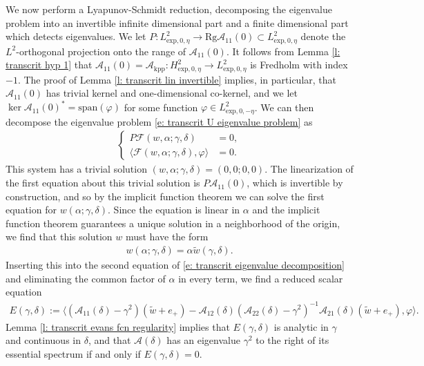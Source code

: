 \documentclass[11pt]{article}
\renewcommand{\phi}{\varphi}
\newcommand{\spn}{\text{\span}}
\newcommand{\Rg}{\mathrm{Rg}}
\numberwithin{equation}{section}
\numberwithin{prop}{section}
\renewcommand{\spn}{\mathrm{span}}
\begin{document}
We now perform a Lyapunov-Schmidt reduction, decomposing the eigenvalue problem into an invertible infinite dimensional part and a finite dimensional part which detects eigenvalues. We let $P: L^2_{\mathrm{exp}, 0, \eta} \to \Rg \mathcal{A}_{11}(0) \subset L^2_{\mathrm{exp}, 0, \eta}$ denote the $L^2$-orthogonal projection onto the range of $\mathcal{A}_{11}(0)$. It follows from Lemma \ref{l: transcrit hyp 1} that $\mathcal{A}_{11}(0) = \mathcal{A}_\mathrm{kpp} : H^2_{\mathrm{exp}, 0, \eta} \to L^2_{\mathrm{exp}, 0, \eta}$ is Fredholm with index $-1$. The proof of Lemma \ref{l: transcrit lin invertible} implies, in particular, that $\mathcal{A}_{11}(0)$ has trivial kernel and one-dimensional co-kernel, and we let $\ker \mathcal{A}_{11}(0)^* = \spn (\phi)$ for some function $\phi \in L^2_{\mathrm{exp}, 0, -\eta}$. We can then decompose the eigenvalue problem \eqref{e: transcrit U eigenvalue problem} as 
\begin{align}
	\begin{cases}
		P \mathcal{F} (w, \alpha; \gamma, \delta) &= 0, \\
		\langle \mathcal{F}(w, \alpha;\gamma, \delta), \phi \rangle &= 0. 
	\end{cases} \label{e: transcrit eigenvalue decomposition}
\end{align}
This system has a trivial solution $(w, \alpha; \gamma, \delta) = (0, 0; 0, 0)$. The linearization of the first equation about this trivial solution is $P \mathcal{A}_{11}(0)$, which is invertible by construction, and so by the implicit function theorem we can solve the first equation for $w(\alpha; \gamma, \delta)$. Since the equation is linear in $\alpha$ and the implicit function theorem guarantees a unique solution in a neighborhood of the origin, we find that this solution $w$ must have the form
\begin{align}
	w (\alpha; \gamma, \delta) = \alpha \tilde{w}(\gamma, \delta). 
\end{align}
Inserting this into the second equation of \eqref{e: transcrit eigenvalue decomposition} and eliminating the common factor of $\alpha$ in every term, we find a reduced scalar equation
\begin{align}
	E(\gamma, \delta) := \langle (\mathcal{A}_{11}(\delta) - \gamma^2) (\tilde{w} + e_+) - \mathcal{A}_{12} (\delta) (\mathcal{A}_{22}(\delta) - \gamma^2)^{-1} \mathcal{A}_{21}(\delta) (\tilde{w} + e_+), \phi \rangle.
\end{align}
Lemma \ref{l: transcrit evans fcn regularity} implies that $E(\gamma, \delta)$ is analytic in $\gamma$ and continuous in $\delta$, and that $\mathcal{A}(\delta)$ has an eigenvalue $\gamma^2$ to the right of its essential spectrum if and only if $E(\gamma, \delta) = 0$. 
\end{document}

